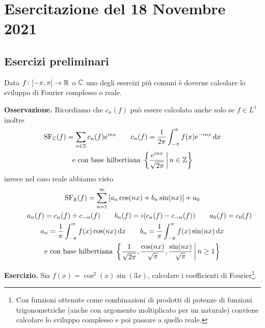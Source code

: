 %
%

\section{Esercitazione del 18 Novembre 2021}

\subsection{Esercizi preliminari}

Data $f \colon [-\pi, \pi] \to \mathbb R$ o $\mathbb C$ uno degli esercizi più comuni è doverne calcolare lo sviluppo di Fourier complesso o reale.

\textbf{Osservazione.}
Ricordiamo che $c_n(f)$ può essere calcolato anche solo se $f \in L^1$ inoltre
$$
\begin{gathered}
	\operatorname{SF}_\mathbb C(f) = \sum_{n \in \mathbb Z} c_n(f) e^{inx}
	\qquad
	c_n(f) = \frac{1}{2\pi} \int_{-\pi}^\pi f(x) e^{-inx} \,\mathrm{d} x \\
	\text{e con base hilbertiana } \left\{ \frac{e^{inx}}{\sqrt{2\pi}} \,\middle|\, n \in \mathbb Z \right\}
\end{gathered}
$$
invece nel caso reale abbiamo visto
$$
\begin{gathered}
	\operatorname{SF}_\mathbb R(f) = \sum_{n=1}^\infty \left[ a_n \cos(nx) + b_n \sin(nx) \right] + a_0 \\
	\qquad
	a_n(f) = c_n(f) + c_{-n}(f)
	\qquad
	b_n(f) = i(c_n(f) - c_{-n}(f))
	\qquad
	a_0(f) = c_0(f) \\
	a_n = \frac{1}{\pi} \int_{-\pi}^\pi f(x) \cos(nx) \,\mathrm{d} x
	\qquad
	b_n = \frac{1}{\pi} \int_{-\pi}^\pi f(x) \sin(nx) \,\mathrm{d} x \\
	\text{e con base hilbertiana } \left\{ \frac{1}{\sqrt{2\pi}}, \frac{\cos(nx)}{\sqrt{\pi}}, \frac{\sin(nx)}{\sqrt{\pi}} \,\middle|\, n \geq 1 \right\}
\end{gathered}
$$

\textbf{Esercizio.}
Sia $f(x) = \cos^2(x) \sin(3x)$, calcolare i coefficienti di Fourier\footnote{Con funzioni ottenute come combinazioni di prodotti di potenze di funzioni trigonometriche (anche con argomento moltiplicato per un naturale) conviene calcolare lo sviluppo complesso e poi passare a quello reale.}.

